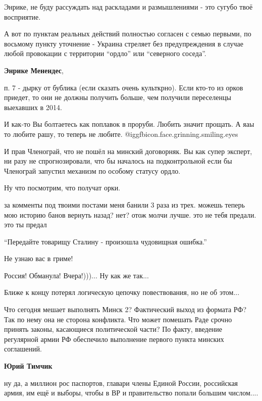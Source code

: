 \begin{itemize}
Энрике, не буду рассуждать над раскладами и размышлениями - это сугубо твоё восприятие.

А вот по пунктам реальных действий полностью согласен с семью первыми, по
восьмому пункту уточнение - Украина стреляет без предупреждения в случае любой
провокации с территории \enquote{ордло} или \enquote{северного соседа}.

\textbf{Энрике Менендес}, 

п. 7 - дырку от бублика (если сказать очень культкрно). Если кто-то из орков
приедет, то они не должны получить больше, чем получили переселенцы выехавших в
2014.

И как-то Вы болтаетесь как поплавок в проруби. Любить значит прощать. А яаы то
любите рашу, то теперь не любите.  @igg{fbicon.face.grinning.smiling.eyes} 

И прав Членограй, что не пошёл на минский договорняк. Вы как супер эксперт, ни
разу не спрогнозировали, что бы началось на подконтрольной если бы Членограй
запустил механизм по особому статусу ордло.

Ну что посмотрим, что получат орки.


за комменты под твоими постами меня банили 3 раза из трех. можешь теперь мою
историю банов вернуть назад? нет? отож молчи лучше. это не тебя предали. это ты
предал

\enquote{Передайте товарищу Сталину - произошла чудовищная ошибка.}

Не узнаю вас в гриме!

Россия! Обманула! Вчера!)))... Ну как же так...


Ближе к концу потерял логическую цепочку повествования, но не об этом...

Что сегодня мешает выполнять Минск 2? Фактический выход из формата РФ? Так по
нему она не сторона конфликта. Что может помешать Раде срочно принять законы,
касающиеся политической части? По факту, введение регулярной армии РФ
обеспечило выполнение первого пункта минских соглашений.

\begin{itemize} %
\textbf{Юрий Тимчик} 

ну да, а миллион рос паспортов, главари члены Единой России, российская армия,
им ещё и выборы, чтобы в ВР и правительство попали большим числом....


\end{itemize}
\end{itemize}
